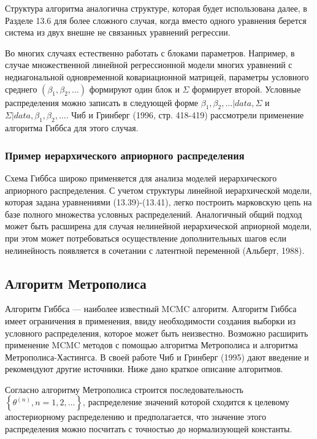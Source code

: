Структура алгоритма аналогична структуре, которая будет использована далее, в Разделе 13.6 для более сложного случая, когда вместо одного уравнения берется система из двух внешне не связанных уравнений регрессии.

Во многих случаях естественно работать с блоками параметров. Например, в случае множественной линейной регрессионной модели многих уравнений с недиагональной одновременной ковариационной матрицей, параметры условного среднего $(\beta_1,\beta_2,\ldots )$ формируют один блок  и $\Sigma$ формирует второй. Условные распределения можно записать в следующей форме $\beta_1,\beta_2,\ldots |data,\Sigma$ и $\Sigma|data,\beta_1,\beta_2,\ldots $. Чиб и Гринберг (1996, стр. 418-419) рассмотрели применение алгоритма Гиббса для этого случая.

\subsubsection*{Пример иерархического априорного распределения}

Схема Гиббса широко применяется для анализа моделей иерархического априорного распределения. С учетом структуры линейной иерархической модели, которая задана уравнениями (13.39)-(13.41), легко построить марковскую цепь на базе полного множества условных распределений. Аналогичный общий подход может быть расширена для случая нелинейной иерархической априорной модели, при этом может потребоваться осуществление дополнительных шагов если нелинейность появляется в сочетании с  латентной переменной (Альберт, 1988).

\subsection{Алгоритм Метрополиса}

Алгоритм Гиббса --- наиболее известный MCMC алгоритм. Алгоритм Гиббса имеет ограничения в применения, ввиду необходимости создания выборки из  условного распределения, которое может быть неизвестно. Возможно расширить применение MCMC методов с помощью алгоритма Метрополиса и алгоритма Метрополиса-Хастингса. В своей работе Чиб и Гринберг (1995) дают введение и рекомендуют  другие источники. Ниже дано краткое описание алгоритмов.

Согласно алгоритму Метрополиса строится последовательность $\left\lbrace\theta^{(n)}, n=1,2,\ldots \right\rbrace$, распределение значений которой сходится к целевому апостериорному распределению и предполагается, что значение этого распределения можно посчитать с точностью до нормализующей константы.

